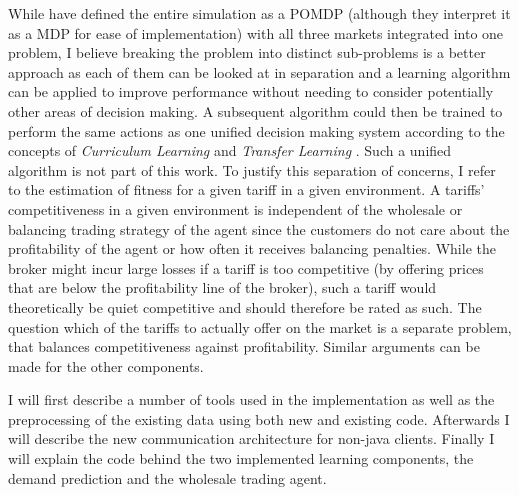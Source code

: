 While \citep{tactexurieli2016mdp} have defined the entire simulation as a \ac {POMDP} (although they interpret it as a
\ac {MDP} for ease of implementation) with all three markets integrated into one problem, I believe breaking the problem
into distinct sub-problems is a better approach as each of them can be looked at in separation and a learning algorithm
can be applied to improve performance without needing to consider potentially other areas of decision making. A
subsequent algorithm could then be trained to perform the same actions as one unified decision making system according
to the concepts of \emph{Curriculum Learning}\citep{matiisen2017teacher} and \emph{Transfer Learning}
\citep{parisotto2015actor}. Such a unified algorithm is not part of this work.
To justify this separation of concerns, I refer to the estimation of fitness for a given tariff in a given environment.
A tariffs' competitiveness in a given environment is independent of the wholesale or balancing trading strategy of the
agent since the customers do not care about the profitability of the agent or how often it receives balancing penalties.
While the broker might incur large losses if a tariff is too competitive (by offering prices that are below the
profitability line of the broker), such a tariff would theoretically be quiet competitive and should therefore be rated
as such. The question which of the tariffs to actually offer on the market is a separate problem, that balances
competitiveness against profitability. Similar arguments can be made for the other components.

I will first describe a number of tools used in the implementation as well as the preprocessing of the existing data
using both new and existing code. Afterwards I will describe the new communication architecture for non-java clients.
Finally I will explain the code behind the two implemented learning components, the demand prediction and the wholesale
trading agent.


